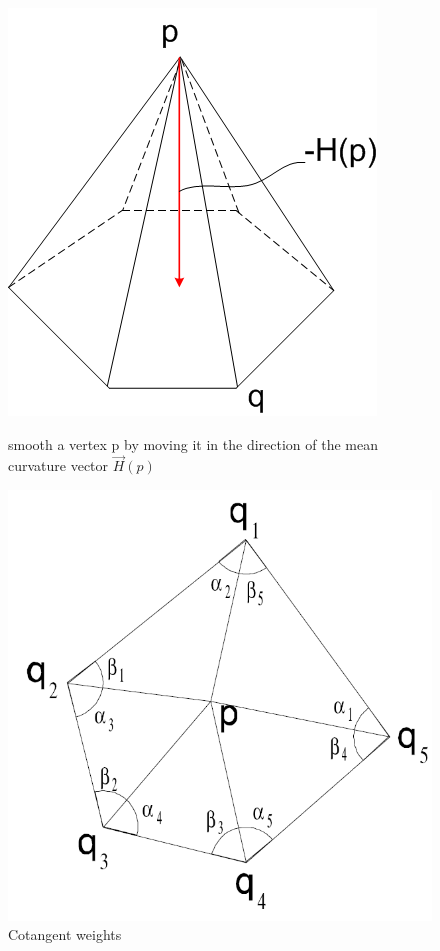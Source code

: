 \documentclass[11pt]{article}
\begin{document}
\begin{figure}[htbp]
  \begin{minipage}[b]{0.45\linewidth}
    \centering
    \includegraphics[width=\textwidth]{umbrella.png}
    \caption{smooth a vertex p by moving it in the direction of the mean curvature vector $\vec{H}(p)$}
    \label{fig:umbrella}
  \end{minipage}
  \hspace{0.5cm}
  \begin{minipage}[b]{0.45\linewidth}
    \centering
    \includegraphics[width=\linewidth]{cotangent.png}
    \caption{Cotangent weights}
    \label{fig:cotangent}
  \end{minipage}
\end{figure}
\end{document}
